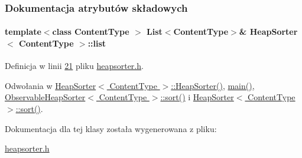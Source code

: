 \subsubsection{Dokumentacja atrybutów składowych}
\hypertarget{class_heap_sorter_ae5061b641a597893a2e7f747c9cc15f2}{
\paragraph[{list}]{\setlength{\rightskip}{0pt plus 5cm}template$<$class Content\-Type $>$ {\bf List}$<$Content\-Type$>$\& {\bf Heap\-Sorter}$<$ Content\-Type $>$\-::list}}\label{class_heap_sorter_ae5061b641a597893a2e7f747c9cc15f2}


Definicja w linii \hyperlink{heapsorter_8h_source_l00021}{21} pliku \hyperlink{heapsorter_8h_source}{heapsorter.\-h}.



Odwołania w \hyperlink{heapsorter_8h_source_l00026}{Heap\-Sorter$<$ Content\-Type $>$\-::\-Heap\-Sorter()}, \hyperlink{main_8cpp_source_l00022}{main()}, \hyperlink{observableheapsorter_8h_source_l00026}{Observable\-Heap\-Sorter$<$ Content\-Type $>$\-::sort()} i \hyperlink{heapsorter_8h_source_l00042}{Heap\-Sorter$<$ Content\-Type $>$\-::sort()}.



Dokumentacja dla tej klasy została wygenerowana z pliku\-:\begin{DoxyCompactItemize}
\item 
\hyperlink{heapsorter_8h}{heapsorter.\-h}\end{DoxyCompactItemize}
